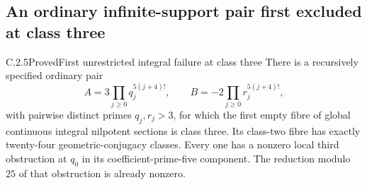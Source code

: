 \subsection{An ordinary infinite-support pair first excluded at class three}
\label{sec:ghost-class3-example}

\begin{result}{C.2.5}{Proved}{First unrestricted integral failure at class three}
\label{thm:ghost-first-integral-class3}
There is a recursively specified ordinary pair
\[
 A=3\prod_{j\ge0}q_j^{5(j+4)!},\qquad
 B=-2\prod_{j\ge0}r_j^{5(j+4)!},
\]
with pairwise distinct primes \(q_j,r_j>3\), for which
the first empty fibre of global continuous integral
nilpotent sections is class three. Its class-two fibre
has exactly twenty-four geometric-conjugacy classes.
Every one has a nonzero local third obstruction at
\(q_0\) in its coefficient-prime-five component.
The reduction modulo \(25\) of that obstruction is
already nonzero.
\end{result}
